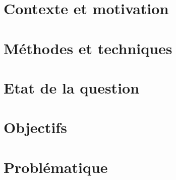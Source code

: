 

\section{Contexte et motivation}\label{sec:contexte-et-motivation}


\section{Méthodes et techniques}\label{sec:methode}



\section{Etat de la question}\label{sec:etat-de-l-art}


\section{Objectifs}\label{sec:objectifs}


\section{Problématique}\label{sec:problematique}

